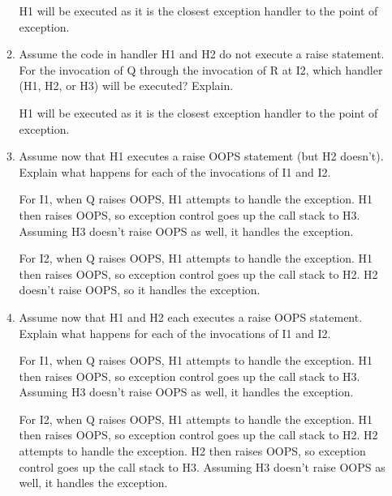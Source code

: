 \documentclass[12pt,letterpaper]{article}
\begin{document}
\begin{enumerate}
\begin{enumerate}
            H1 will be executed as it is the closest exception handler to the point of exception.

          \item
            Assume the code in handler H1 and H2 do not execute a raise statement.
            For the invocation of Q through the invocation of R at I2,
            which handler (H1, H2, or H3) will be executed? Explain.

            H1 will be executed as it is the closest exception handler to the point of exception.

          \item
            Assume now that H1 executes a raise OOPS statement (but H2 doesn't).
            Explain what happens for each of the invocations of I1 and I2.

            For I1, when Q raises OOPS, H1 attempts to handle the exception.
            H1 then raises OOPS, so exception control goes up the call stack to H3.
            Assuming H3 doesn't raise OOPS as well, it handles the exception.

            For I2, when Q raises OOPS, H1 attempts to handle the exception.
            H1 then raises OOPS, so exception control goes up the call stack to H2.
            H2 doesn't raise OOPS, so it handles the exception.

          \item
            Assume now that H1 and H2 each executes a raise OOPS statement.
            Explain what happens for each of the invocations of I1 and I2.

            For I1, when Q raises OOPS, H1 attempts to handle the exception.
            H1 then raises OOPS, so exception control goes up the call stack to H3.
            Assuming H3 doesn't raise OOPS as well, it handles the exception.

            For I2, when Q raises OOPS, H1 attempts to handle the exception.
            H1 then raises OOPS, so exception control goes up the call stack to H2.
            H2 attempts to handle the exception.
            H2 then raises OOPS, so exception control goes up the call stack to H3.
            Assuming H3 doesn't raise OOPS as well, it handles the exception.
        \end{enumerate}
  \end{enumerate}
\end{document}
